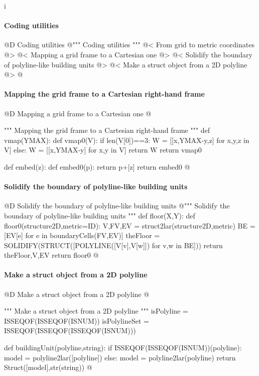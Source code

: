 i\documentclass[11pt,oneside]{article}    %
\begin{document}
\paragraph{Coding utilities}
@D Coding utilities
@{""" Coding utilities """
@< From grid to metric coordinates @>
@< Mapping a grid frame to a Cartesian one @>
@< Solidify the boundary of polyline-like building units @>
@< Make a struct object from a 2D polyline @>
@}

\paragraph{Mapping the grid frame to a Cartesian right-hand frame}
@D Mapping a grid frame to a Cartesian one
@{""" Mapping the grid frame to a Cartesian right-hand frame """
def vmap(YMAX):
    def vmap0(V):
        if len(V[0])==3: W = [[x,YMAX-y,z] for x,y,z in V]
        else: W = [[x,YMAX-y] for x,y in V]
        return W
    return vmap0
                
def embed(z):
    def embed0(p): 
        return p+[z]
    return embed0
@}

\paragraph{Solidify the boundary of polyline-like building units}
@D Solidify the boundary of polyline-like building units
@{""" Solidify the boundary of polyline-like building units """
def floor(X,Y):
    def floor0(structure2D,metric=ID):
        V,FV,EV = struct2lar(structure2D,metric)
        BE = [EV[e] for e in boundaryCells(FV,EV)]
        theFloor = SOLIDIFY(STRUCT([POLYLINE([V[v],V[w]]) for v,w in BE]))
        return theFloor,V,EV
    return floor0
@}

\paragraph{Make a struct object from a 2D polyline}
@D Make a struct object from a 2D polyline
@{""" Make a struct object from a 2D polyline """
isPolyline = ISSEQOF(ISSEQOF(ISNUM))
isPolylineSet = ISSEQOF(ISSEQOF(ISSEQOF(ISNUM)))

def buildingUnit(polyline,string):
    if ISSEQOF(ISSEQOF(ISNUM))(polyline): model = polyline2lar([polyline])
    else: model = polyline2lar(polyline)
    return Struct([model],str(string))
@}
\end{document}
